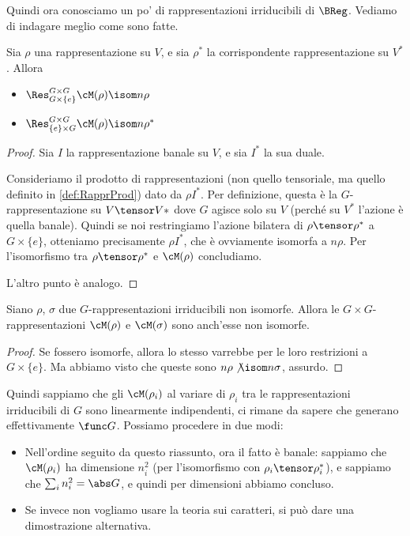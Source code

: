 	Quindi ora conosciamo un po' di rappresentazioni irriducibili di $\BReg$. Vediamo di indagare meglio come sono fatte.
	
	\begin{myprop}
		Sia $\rho$ una rappresentazione su $V$, e sia $\rho^*$ la corrispondente rappresentazione su $V^*$. Allora
		\begin{itemize}
		 \item $\Res_{G\times \{e\}}^{G\times G}\cM(\rho) \isom n\rho$
		 \item $\Res_{\{e\}\times G}^{G\times G}\cM(\rho) \isom n\rho^*$
		\end{itemize}

	 
	\end{myprop}

	\begin{proof}
		Sia $I$ la rappresentazione banale su $V$, e sia $I^*$ la sua duale. 

		Consideriamo il prodotto di rappresentazioni (non quello tensoriale, ma quello definito in \ref{def:RapprProd}) dato da $\rho I^*$. Per definizione, questa è la $G$-rappresentazione su $V\tensor V*$ dove $G$ agisce solo su $V$ (perché su $V^*$ l'azione è quella banale). Quindi se noi restringiamo l'azione bilatera di $\rho \tensor \rho^*$ a $G \times \{e\}$, otteniamo precisamente $\rho I^*$, che è ovviamente isomorfa a $n\rho$. Per l'isomorfismo tra $\rho \tensor \rho^*$ e $\cM(\rho)$ concludiamo.
		
		L'altro punto è analogo.
	\end{proof}		
	
	\begin{myprop}
	 Siano $\rho$, $\sigma$ due $G$-rappresentazioni irriducibili non isomorfe. Allora le $G\times G$-rappresentazioni $\cM(\rho)$ e $\cM(\sigma)$ sono anch'esse non isomorfe.
	\end{myprop}
	
	\begin{proof}
	 Se fossero isomorfe, allora lo stesso varrebbe per le loro restrizioni a $G \times \{e\}$. Ma abbiamo visto che queste sono $n\rho \not\isom n\sigma$, assurdo.
	\end{proof}
	
	Quindi sappiamo che gli $\cM(\rho_i)$ al variare di $\rho_i$ tra le rappresentazioni irriducibili di $G$ sono linearmente indipendenti, ci rimane da sapere che generano effettivamente $\func G$. Possiamo procedere in due modi:
	
	\begin{itemize}
	 \item Nell'ordine seguito da questo riassunto, ora il fatto è banale: sappiamo che $\cM(\rho_i)$ ha dimensione $n_i^2$ (per l'isomorfismo con $\rho_i \tensor \rho_i^*$), e sappiamo che $\sum_i n_i^2 = \abs G$, e quindi per dimensioni abbiamo concluso.
	 \item Se invece non vogliamo usare la teoria sui caratteri, si può dare una dimostrazione alternativa. %
	\end{itemize}
	
	



